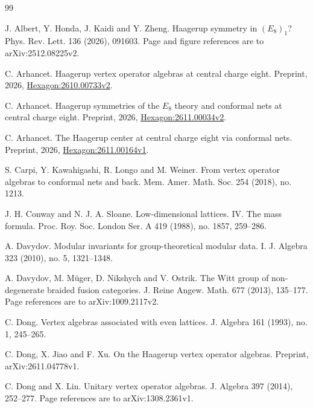 \documentclass[leqno]{article}
\numberwithin{equation}{section}
\begin{document}
\small
\begin{thebibliography}{99}

J. Albert, Y. Honda, J. Kaidi and Y. Zheng.
\newblock Haagerup symmetry in $(E_8)_1$?
\newblock Phys. Rev. Lett. 136 (2026), 091603. Page and figure references are to arXiv:2512.08225v2.

C. Arhancet.
\newblock Haagerup vertex operator algebras at central charge eight.
\newblock Preprint, 2026, \href{https://hexagonmath.org/2610.00733v2}{Hexagon:2610.00733v2}.

C. Arhancet.
\newblock Haagerup symmetries of the $E_8$ theory and conformal nets at central charge eight.
\newblock Preprint, 2026, \href{https://hexagonmath.org/2611.00034v2}{Hexagon:2611.00034v2}.

C. Arhancet.
\newblock The Haagerup center at central charge eight via conformal nets.
\newblock Preprint, 2026, \href{https://hexagonmath.org/2611.00164v1}{Hexagon:2611.00164v1}.

S. Carpi, Y. Kawahigashi, R. Longo and M. Weiner.
\newblock From vertex operator algebras to conformal nets and back.
\newblock Mem. Amer. Math. Soc. 254 (2018), no. 1213.

J. H. Conway and N. J. A. Sloane.
\newblock Low-dimensional lattices. IV. The mass formula.
\newblock Proc. Roy. Soc. London Ser. A 419 (1988), no. 1857, 259--286.

A. Davydov.
\newblock Modular invariants for group-theoretical modular data. I.
\newblock J. Algebra 323 (2010), no. 5, 1321--1348.

A. Davydov, M. Müger, D. Nikshych and V. Ostrik.
\newblock The Witt group of non-degenerate braided fusion categories.
\newblock J. Reine Angew. Math. 677 (2013), 135--177. Page references are to arXiv:1009.2117v2.

C. Dong.
\newblock Vertex algebras associated with even lattices.
\newblock J. Algebra 161 (1993), no. 1, 245--265.

C. Dong, X. Jiao and F. Xu.
\newblock On the Haagerup vertex operator algebras.
\newblock Preprint, arXiv:2611.04778v1.

C. Dong and X. Lin.
\newblock Unitary vertex operator algebras.
\newblock J. Algebra 397 (2014), 252--277. Page references are to arXiv:1308.2361v1.


\end{thebibliography}
\end{document}

